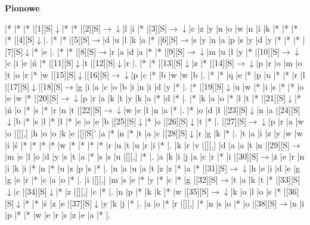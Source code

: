 \documentclass[11pt]{article}
\newcommand\drarr{$\rightarrow \!\!\!\!\! \downarrow$}
\newcommand\rarr{$\rightarrow$}
\newcommand\darr{$\downarrow$}
\begin{document}
\begin{PuzzleClues}{\textbf{Pionowe}\\}
\end{PuzzleClues}\newpage%

\noindent\begin{Puzzle}{24}{28}|*	|*	|*	|[1][S]\darr	|*	|*	|[2][S]\drarr	|l	|i	|*	|[3][S]\drarr	|c	|z	|y	|n	|o	|w	|n	|i	|k	|*	|*	|*	|*	|[4][S]\darr	|.
|*	|*	|[5][S]\rarr	|d	|u	|l	|k	|a	|*	|[6][S]\rarr	|s	|y	|n	|a	|p	|s	|y	|d	|y	|*	|*	|*	|[7][S]\darr	|*	|e	|.
|*	|*	|[8][S]\rarr	|r	|a	|d	|a	|*	|*	|[9][S]\drarr	|m	|u	|ł	|y	|*	|[10][S]\drarr	|c	|i	|e	|ń	|*	|[11][S]\darr	|t	|[12][S]\darr	|r	|.
|*	|*	|[13][S]\darr	|z	|*	|[14][S]\drarr	|p	|r	|o	|m	|o	|t	|o	|r	|*	|w	|[15][S]\darr	|[16][S]\drarr	|p	|c	|*	|b	|w	|w	|b	|.
|*	|*	|q	|e	|*	|p	|u	|*	|*	|r	|l	|[17][S]\darr	|[18][S]\rarr	|g	|i	|a	|c	|o	|b	|i	|n	|i	|d	|y	|*	|.
|*	|[19][S]\darr	|u	|w	|*	|i	|s	|*	|*	|o	|e	|w	|*	|[20][S]\drarr	|p	|r	|a	|k	|t	|y	|k	|a	|*	|d	|*	|.
|*	|k	|a	|o	|*	|l	|t	|*	|[21][S]\darr	|*	|ń	|o	|*	|s	|*	|r	|n	|t	|[22][S]\drarr	|w	|e	|ł	|n	|a	|*	|.
|*	|o	|d	|ł	|[23][S]\darr	|n	|a	|[24][S]\darr	|b	|*	|s	|l	|*	|ł	|*	|e	|o	|e	|b	|[25][S]\darr	|*	|o	|[26][S]\darr	|t	|*	|.
|[27][S]\drarr	|p	|r	|a	|w	|o	|[][,]{ }	|h	|o	|o	|k	|e	|[][S]’	|a	|*	|n	|*	|t	|a	|c	|[28][S]\darr	|r	|g	|k	|*	|.
|t	|a	|i	|z	|y	|w	|w	|i	|ś	|*	|*	|*	|*	|w	|*	|*	|*	|*	|r	|u	|t	|u	|r	|i	|*	|.
|k	|r	|v	|[][,]{ }	|d	|a	|a	|t	|n	|[29][S]\rarr	|m	|e	|l	|o	|d	|y	|s	|t	|a	|*	|s	|s	|u	|[][,]{ }	|*	|.
|a	|k	|i	|j	|a	|c	|r	|*	|i	|[30][S]\rarr	|ż	|e	|r	|n	|i	|k	|i	|*	|n	|*	|u	|z	|p	|s	|*	|.
|n	|a	|u	|a	|t	|z	|z	|*	|a	|*	|[31][S]\drarr	|h	|e	|i	|d	|e	|g	|g	|e	|r	|*	|c	|a	|o	|*	|.
|i	|[][,]{ }	|m	|s	|e	|*	|y	|*	|c	|*	|g	|[32][S]\rarr	|t	|a	|k	|t	|*	|[33][S]\darr	|c	|[34][S]\darr	|*	|z	|[][,]{ }	|c	|*	|.
|n	|p	|*	|k	|k	|*	|w	|[35][S]\drarr	|k	|o	|l	|o	|s	|*	|[36][S]\darr	|*	|*	|ś	|z	|e	|[37][S]\darr	|y	|k	|j	|*	|.
|a	|o	|*	|r	|[][,]{ }	|*	|n	|s	|o	|*	|o	|[38][S]\rarr	|n	|i	|p	|*	|*	|w	|e	|r	|s	|z	|e	|a	|*	|.

\end{Puzzle}
\end{document}
